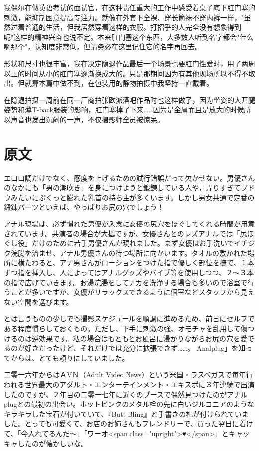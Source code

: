 \documentclass[12pt,UTF8]{ctexbook}
\begin{document}
我偶尔在做英语考试的面试官，在这种责任重大的工作中感受着桌子底下肛门塞的刺激，能抑制困意提高专注力。就像在外套下全裸、穿长筒袜不穿内裤一样，"虽然过着普通的生活，但我居然穿着这样的衣服。打招乎的人完全没有想象得到呢"这样的精神兴奋也说不定。本来肛门塞这个东西，大多数人听到名字都会"什么啊那个"，认知度非常低，但请务必在这里记住它的名字再回去。

形状和尺寸也很丰富，我在决定隐退作品最后一个场景也要肛门性爱时，用了两周以上的时间从小的肛门塞逐渐换成大的。只是那期间因为有其他现场所以不得不取出。但就算本篇中做不到，在包装用的静物拍摄中我坚持一直戴着。

在隐退拍摄一周前在同一厂商拍张欧派酒吧作品时也这样做了，因为坐姿的大开腿姿势和薄T-back服装的影响，肛门塞掉了下来……因为是金属而且是放大的时候所以声音也发出沉闷的一声，不仅摄影师全员被惊呆。

\switchcolumn

\section*{原文}

エ口口調だけでなく、感度を上げるための試行錯誤だって欠かせない。男優さんのなかにも「男の潮吹き」を身につけようと鍛錬している人や，弄りすぎてブドウみたいにぷくっと膨れた乳首の持ち主が多くいます。しかし男女共通で定番の鍛錬パーツといえば、やっぱりお尻の穴でしょう！

アナル現場は、必ず慣れた男優が入念に女優の尻穴をほぐしてくれる時間が用意されています。共演者の場合が大抵ですが、女優さんとのレズアナルでは「尻ほぐし役」だけのために若手男優さんが現れました。まず女優はお手洗いでイチジク浣腸を済ませ、アナル男優さんの待つ場所に向かいます。タオルの敷かれた場所に横たわると、アナ男さんがローションをつけた指で優しく部位を撫で、１本ずつ指を挿入し、人によってはアナルグッズやバイブ等を使用しつつ、２〜３本の指で広げていきます。お湯浣腸をしてナカを洗浄する場合も多いので浴室で行うことが多いですが、女優がリラックスできるように個室などスタッフから見えない空間を選びます。

とは言うものの少しでも撮影スケジュールを順調に進めるため、前日にセルフである程度慣らしておくもの。ただし、下手に刺激の強、オモチャを乱用して傷つけるのは逆効果です。私の場合はもともとお風呂に浸かりながらお尻の穴を愛でるのが好きだったけど、それだけでは充分に拡張できず……。 Analplug」を知ってからは、とても頼りにしていました。

二零一六年からはＡVＮ（Adult Video News）という米国・ラスベガスで毎年行われる世界最大のアダルト・エンターテインメント・エキスポに３年連続で出演したのですが、２年目の二零一七年に近くのブースで偶然見つけたのがアナルplugとの最初の出会い。ホットピンクのメタル栓の先に白いジルコニアのようなキラキラした宝石が付いていて、『Butt Bling』と手書きの札が付けられていました。とっても可愛くて、お店のお姉さんもフレンドリーで、買った翌日に着けて、「今入れてるんだ〜」「ワーオ<span class="upright">♥</span>」とキャッキャしたのが懐かしいな。
\end{document}
